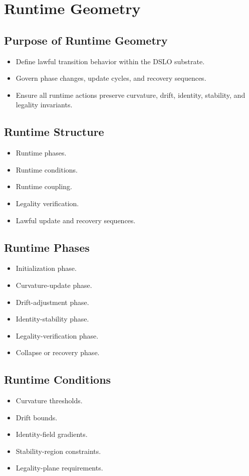 \section{Runtime Geometry}

\subsection{Purpose of Runtime Geometry}
\begin{itemize}
    \item Define lawful transition behavior within the DSLO substrate.
    \item Govern phase changes, update cycles, and recovery sequences.
    \item Ensure all runtime actions preserve curvature, drift, identity, stability, and legality invariants.
\end{itemize}

\subsection{Runtime Structure}
\begin{itemize}
    \item Runtime phases.
    \item Runtime conditions.
    \item Runtime coupling.
    \item Legality verification.
    \item Lawful update and recovery sequences.
\end{itemize}

\subsection{Runtime Phases}
\begin{itemize}
    \item Initialization phase.
    \item Curvature-update phase.
    \item Drift-adjustment phase.
    \item Identity-stability phase.
    \item Legality-verification phase.
    \item Collapse or recovery phase.
\end{itemize}

\subsection{Runtime Conditions}
\begin{itemize}
    \item Curvature thresholds.
    \item Drift bounds.
    \item Identity-field gradients.
    \item Stability-region constraints.
    \item Legality-plane requirements.
\end{itemize}


